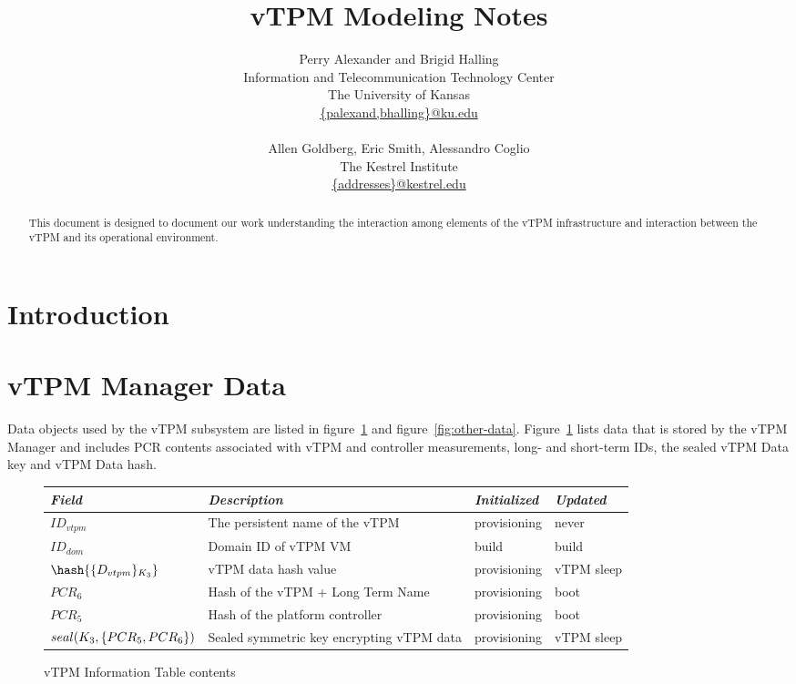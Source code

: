 \documentclass[10pt]{article}
\title{vTPM Modeling Notes}
\author{Perry Alexander and Brigid Halling \\
  Information and Telecommunication Technology Center \\
  The University of Kansas \\
  \url{{palexand,bhalling}@ku.edu} \\
  \\
  Allen Goldberg, Eric Smith, Alessandro Coglio \\
  The Kestrel Institute \\
  \url{{addresses}@kestrel.edu}}
\begin{document}
\maketitle
\tableofcontents
\listoffigures
\listoftables

\newtheorem{invariant}{Invariant}
\newtheorem{post}{Postcondition}
\newtheorem{pre}{Precondition}

\begin{abstract}
  This document is designed to document our work understanding the
  interaction among elements of the vTPM infrastructure and
  interaction between the vTPM and its operational environment.
\end{abstract}

\section{Introduction}

\section{vTPM Manager Data}

Data objects used by the vTPM subsystem are listed in
figure~\ref{fig:vtpm-information-table-format} and
figure~\ref{fig:other-data}.
Figure~\ref{fig:vtpm-information-table-format} lists data that is
stored by the vTPM Manager and includes PCR contents associated with
vTPM and controller measurements, long- and short-term IDs, the sealed
vTPM Data key and vTPM Data hash.

\begin{figure}[hbtp]
  \centering
  \begin{tabular}{llll}
    \emph{Field} & \emph{Description} & \emph{Initialized} &
    \emph{Updated} \\ \hline
    $ID_{vtpm}$ & The persistent name of the vTPM & provisioning &
    never \\
    $ID_{dom}$ & Domain ID of vTPM VM & build & build \\
    $\hash{\encrypt{D_{vtpm}}{K_3}}$ & vTPM data hash value & provisioning & vTPM sleep \\
    $PCR_6$ & Hash of the vTPM + Long Term Name & provisioning & boot
    \\
    $PCR_5$ & Hash of the platform controller & provisioning & boot \\
    $seal(K_{3},\{PCR_5,PCR_6\})$ & Sealed symmetric key encrypting vTPM data &
    provisioning & vTPM sleep \\
  \end{tabular}
  \caption{vTPM Information Table contents}
  \label{fig:vtpm-information-table-format}
\end{figure}
\end{document}

